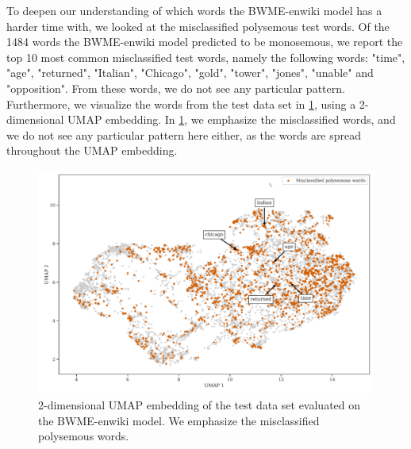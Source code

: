 To deepen our understanding of which words the BWME-enwiki model has a harder time with, we looked at the misclassified polysemous test words. Of the 1484 words the BWME-enwiki model predicted to be monosemous, we report the top 10 most common misclassified test words, namely the following words: "time", "age", "returned", "Italian", "Chicago", "gold", "tower", "jones", "unable" and "opposition". From these words, we do not see any particular pattern. Furthermore, we visualize the words from the test data set in \cref{fig:bwme-enwiki-umap-misclassified-polysemous-words}, using a 2-dimensional UMAP embedding. In \cref{fig:bwme-enwiki-umap-misclassified-polysemous-words}, we emphasize the misclassified words, and we do not see any particular pattern here either, as the words are spread throughout the UMAP embedding.
\begin{figure}[H]
    \centering
    \includegraphics[width=\textwidth]{thesis/figures/bwme-enwiki-umap-misclassified-polysemous-words.pdf}
    \caption{2-dimensional UMAP embedding of the test data set evaluated on the BWME-enwiki model. We emphasize the misclassified polysemous words.}
    \label{fig:bwme-enwiki-umap-misclassified-polysemous-words}
\end{figure}

